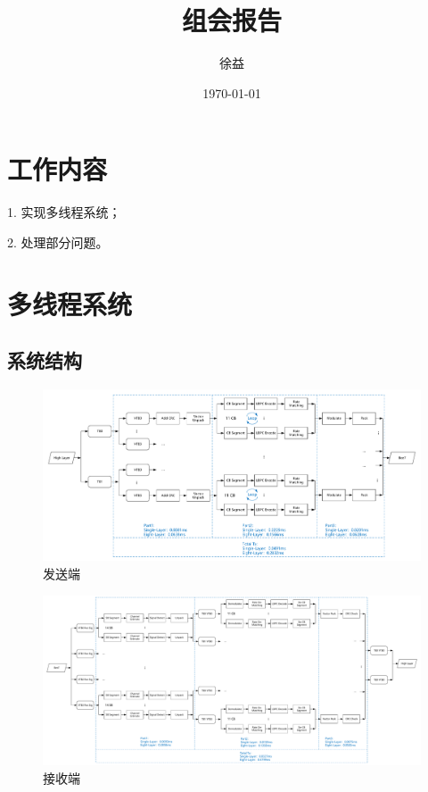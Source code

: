 \documentclass{article}
\title{组会报告}
\author{徐益}
\date{\today}
\begin{document}
\maketitle


\section{工作内容}
1. 实现多线程系统；

2. 处理部分问题。

\section{多线程系统}
\subsection{系统结构}
\begin{figure}[H]
	\centering
	\includegraphics[width = .8\textwidth]{txstr.pdf}
	\caption{发送端}
\end{figure}
\begin{figure}[H]
	\centering
	\includegraphics[width = .8\textwidth]{rxstr.pdf}
	\caption{接收端}
\end{figure}
\end{document}

